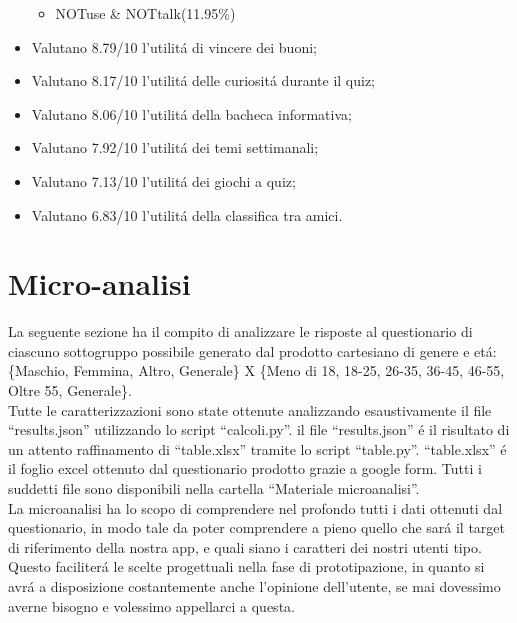 \documentclass{article}
\begin{document}
\begin{itemize}
\begin{itemize}
	\item NOTuse \& NOTtalk(11.95\%)
	\end{itemize}
\item Valutano 8.79/10 l’utilitá di vincere dei buoni;
\item Valutano 8.17/10 l’utilitá delle curiositá durante il quiz;
\item Valutano 8.06/10 l’utilitá della bacheca informativa;
\item Valutano 7.92/10 l’utilitá dei temi settimanali;
\item Valutano 7.13/10 l’utilitá dei giochi a quiz;
\item Valutano 6.83/10 l’utilitá della classifica tra amici.
\end{itemize}


\section{Micro-analisi}
La seguente sezione ha il compito di analizzare le risposte al questionario di ciascuno sottogruppo possibile generato dal prodotto cartesiano di genere e etá:
\\\indent
\{Maschio, Femmina, Altro, Generale\} X \{Meno di 18, 18-25, 26-35, 36-45, 46-55, Oltre 55, Generale\}.
\\\indent
Tutte le caratterizzazioni sono state ottenute analizzando esaustivamente il file “results.json” utilizzando lo script “calcoli.py”.
il file “results.json” é il risultato di un attento raffinamento di “table.xlsx” tramite lo script “table.py”. 
“table.xlsx” é il foglio excel ottenuto dal questionario prodotto grazie a google form.
Tutti i suddetti file sono disponibili nella cartella “Materiale microanalisi”.
\\\indent
La microanalisi ha lo scopo di comprendere nel profondo tutti i dati ottenuti dal questionario, in modo tale da poter comprendere a pieno quello che sará il target di riferimento della nostra app, e quali siano i caratteri dei nostri utenti tipo. 
Questo faciliterá le scelte progettuali nella fase di prototipazione, in quanto si avrá a disposizione costantemente anche l’opinione dell’utente, se mai dovessimo averne bisogno e volessimo appellarci a questa.
\end{document}
